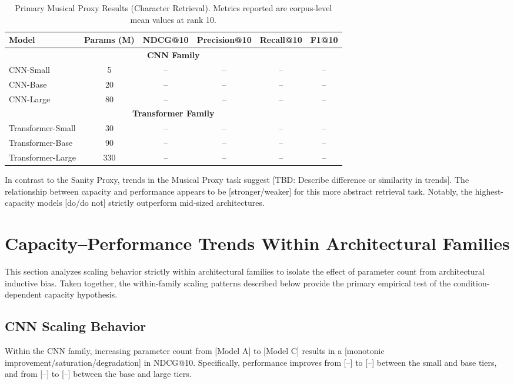 \begin{table}[!htbp]
\centering
\caption{Primary Musical Proxy Results (Character Retrieval). Metrics reported are corpus-level mean values at rank 10.}
\label{tab:musical_results}
\begin{tabular}{lccccc}
\hline
\textbf{Model} & \textbf{Params (M)} & \textbf{NDCG@10} & \textbf{Precision@10} & \textbf{Recall@10} & \textbf{F1@10} \\
\hline
\multicolumn{6}{c}{\textbf{CNN Family}} \\
\hline
CNN-Small & 5  & -- & -- & -- & -- \\
CNN-Base  & 20 & -- & -- & -- & -- \\
CNN-Large & 80 & -- & -- & -- & -- \\
\hline
\multicolumn{6}{c}{\textbf{Transformer Family}} \\
\hline
Transformer-Small & 30  & -- & -- & -- & -- \\
Transformer-Base  & 90  & -- & -- & -- & -- \\
Transformer-Large & 330 & -- & -- & -- & -- \\
\hline
\end{tabular}
\end{table}



In contrast to the Sanity Proxy, trends in the Musical Proxy task suggest [TBD: Describe difference or similarity in trends]. The relationship between capacity and performance appears to be [stronger/weaker] for this more abstract retrieval task. Notably, the highest-capacity models [do/do not] strictly outperform mid-sized architectures.

\section{Capacity–Performance Trends Within Architectural Families}
This section analyzes scaling behavior strictly within architectural families to isolate the effect of parameter count from architectural inductive bias.
Taken together, the within-family scaling patterns described below provide the primary empirical test of the condition-dependent capacity hypothesis.


\subsection{CNN Scaling Behavior}
Within the CNN family, increasing parameter count from [Model A] to [Model C] results in a [monotonic improvement/saturation/degradation] in NDCG@10. 
Specifically, performance improves from [--] to [--] between the small and base tiers, and from [--] to [--] between the base and large tiers.

